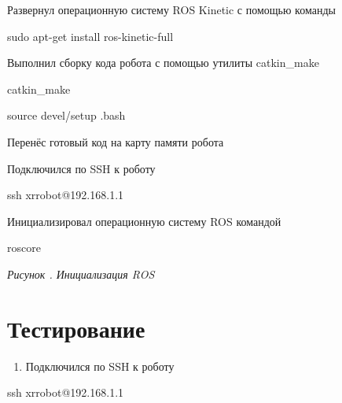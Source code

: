 \documentclass[a4paper]{article}
\newcommand\textstyleHTMLCode[1]{\textrm{#1}}
\newcounter{qwerty}
\renewcommand\theqwerty{\arabic{qwerty}}
\begin{document}
Развернул операционную систему \foreignlanguage{english}{ROS} \foreignlanguage{english}{Kinetic} с помощью команды

\textstyleHTMLCode{\foreignlanguage{english}{sudo apt-get install ros-kinetic-full}}

Выполнил сборку кода робота с помощью утилиты \foreignlanguage{english}{catkin}\_\foreignlanguage{english}{make}

\textstyleHTMLCode{\foreignlanguage{english}{catkin\_make}}

\textstyleHTMLCode{\foreignlanguage{english}{source devel/setup .bash}}

Перенёс готовый код на карту памяти робота 

Подключился по \foreignlanguage{english}{SSH} к роботу

\textstyleHTMLCode{ssh xrrobot@192.168.1.1}

Инициализировал операционную систему \foreignlanguage{english}{ROS} командой 

\textstyleHTMLCode{\foreignlanguage{english}{r}oscore}

\centering
{}
\par
{\centering\itshape\color[HTML]{44546A}
Рисунок \stepcounter{qwerty}{\theqwerty}. Инициализация \foreignlanguage{english}{ROS}
\par}


\bigskip

\section{Тестирование}
\begin{enumerate}[series=listWWNumxvii,label=\arabic*.,ref=\arabic*]
\item Подключился по \foreignlanguage{english}{SSH} к роботу
\end{enumerate}
\textstyleHTMLCode{ssh xrrobot@192.168.1.1}
\end{document}
